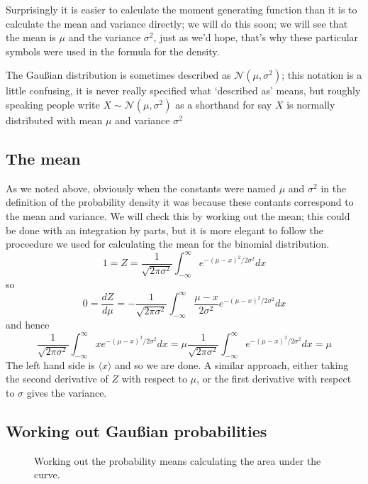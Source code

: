 \documentclass[11pt,a4paper]{scrartcl}
\begin{document}
Surprisingly it is easier to calculate the moment generating function
than it is to calculate the mean and variance directly; we will do
this soon; we will see that the mean is $\mu$ and the variance
$\sigma^2$, just as we'd hope, that's why these particular symbols
were used in the formula for the density.

The Gau\ss{}ian distribution is sometimes described as
$\mathcal{N}(\mu,\sigma^2)$; this notation is a little confusing, it is never
really specified what \lq{}described as\rq{} means, but roughly
speaking people write $X\sim \mathcal{N}(\mu,\sigma^2)$ as a shorthand for say
$X$ is normally distributed with mean $\mu$ and variance $\sigma^2$

\subsection*{The mean}

As we noted above, obviously when the constants were named $\mu$ and
$\sigma^2$ in the definition of the probability density it was because
these contants correspond to the mean and variance. We will check this
by working out the mean; this could be done with an integration by
parts, but it is more elegant to follow the proceedure we used for
calculating the mean for the binomial distribution.
\begin{equation}
1=Z=\frac{1}{\sqrt{2\pi \sigma^2}}\int_{-\infty}^\infty e^{-(\mu-x)^2/2\sigma^2}dx
\end{equation}
so
\begin{equation}
0=\frac{dZ}{d\mu}=-\frac{1}{\sqrt{2\pi \sigma^2}}\int_{-\infty}^\infty\frac{\mu-x}{2\sigma^2} e^{-(\mu-x)^2/2\sigma^2}dx
\end{equation}
and hence
\begin{equation}
\frac{1}{\sqrt{2\pi \sigma^2}}\int_{-\infty}^\infty xe^{-(\mu-x)^2/2\sigma^2}dx=\mu\frac{1}{\sqrt{2\pi \sigma^2}}\int_{-\infty}^\infty e^{-(\mu-x)^2/2\sigma^2}dx=\mu
\end{equation}
The left hand side is $\langle x\rangle$ and so we are done. A similar
approach, either taking the second derivative of $Z$ with respect to
$\mu$, or the first derivative with respect to $\sigma$ gives the
variance.


\subsection*{Working out Gau\ss{}ian probabilities}


\begin{figure}[tb]
\begin{center}

\end{center}
\caption{Working out the probability means calculating the area under the curve.\label{fig_prob}}
\end{figure}
\end{document}
